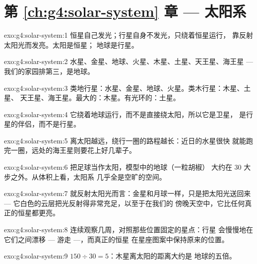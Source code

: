 \section*{第 \ref{ch:g4:solar-system} 章 --- 太阳系}

\begin{solution}{exo:g4:solar-system:1}
恒星自己发光；行星自身不发光，只绕着恒星运行，
靠反射太阳光而发亮。太阳是恒星；
地球是行星。
\end{solution}

\begin{solution}{exo:g4:solar-system:2}
水星、金星、地球、火星、木星、土星、天王星、海王星 ---
我们的家园排第三，是地球。
\end{solution}

\begin{solution}{exo:g4:solar-system:3}
类地行星：水星、金星、地球、火星。类木行星：木星、土星、
天王星、海王星。最大的：木星。有光环的：土星。
\end{solution}

\begin{solution}{exo:g4:solar-system:4}
它绕着地球运行，而不是直接绕太阳，所以它是卫星，
是行星的伴侣，而不是行星。
\end{solution}

\begin{solution}{exo:g4:solar-system:5}
离太阳越远，绕行一圈的路程越长：近日的水星很快
就能跑完一圈，远处的海王星则要花上好几辈子。
\end{solution}

\begin{solution}{exo:g4:solar-system:6}
把足球当作太阳，模型中的地球（一粒胡椒）
大约在 $30$ 大步之外。从体积上看，太阳系
几乎全是空旷的空间。
\end{solution}

\begin{solution}{exo:g4:solar-system:7}
就反射太阳光而言：金星和月球一样，只是把太阳光送回来 ---
它白色的云层把光反射得非常充足，以至于在我们的
傍晚天空中，它比任何真正的恒星都更亮。
\end{solution}

\begin{solution}{exo:g4:solar-system:8}
连续观察几周，对照那些位置固定的星点：行星
会慢慢地在它们之间漂移 --- 游走 ---，而真正的恒星
在星座图案中保持原来的位置。
\end{solution}

\begin{solution}{exo:g4:solar-system:9}
$150 \div 30 = 5$：木星离太阳的距离大约是
地球的五倍。
\end{solution}

